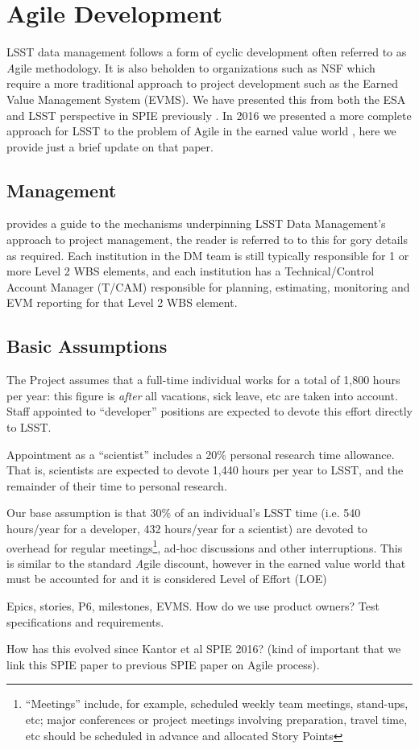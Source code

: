 \section{Agile Development}\label{sec:jira_ticket}

LSST data management follows a form of cyclic development often referred to as {\emph Agile} methodology. It is also beholden to organizations such as NSF which require a more traditional approach to project development such as the Earned Value Management System (EVMS).
We have presented this from both  the ESA and LSST perspective in SPIE previously  \cite{2014SPIE.9150E..1EG}.
In 2016  we presented a more complete approach for LSST to the problem of Agile in the earned value world \cite{2016SPIE.9911E..0NK}, here we provide just a brief update on that paper.

\subsection{Management}
\cite{DMTN-020} provides a guide to the mechanisms underpinning LSST Data Management’s approach to project management, the reader is referred to to this for gory details as required.
Each institution in the DM team is still typically
responsible for 1 or more Level 2 WBS elements, and each institution has a Technical/Control Account Manager
(T/CAM) responsible for planning, estimating, monitoring and EVM reporting for that Level 2 WBS element.

\subsection{Basic Assumptions}
The Project assumes that a full-time individual works for a total of
1,800 hours per year: this figure is \emph{after} all vacations, sick
leave, etc are taken into account. Staff appointed to ``developer''
positions are expected to devote this effort directly to LSST.

Appointment as a ``scientist'' includes a 20\% personal research time
allowance. That is, scientists are expected to devote 1,440 hours per
year to LSST, and the remainder of their time to personal research.

Our base assumption is that 30\% of an individual's LSST time (i.e. 540 hours/year for a developer, 432 hours/year for a scientist) are devoted to overhead for regular meetings\footnote{``Meetings'' include, for example, scheduled weekly team meetings, stand-ups, etc; major conferences or project meetings involving preparation, travel time, etc should be scheduled in advance and allocated Story Points}, ad-hoc discussions and other interruptions.
This is similar to the standard {\emph Agile} discount, however in the earned value world that must be accounted for and it is considered Level of Effort (LOE)



Epics, stories, P6, milestones, EVMS.
How do we use product owners?
Test specifications and requirements.

How has this evolved since Kantor et al SPIE 2016? (kind of important that we link this SPIE paper to previous SPIE paper on Agile process).

